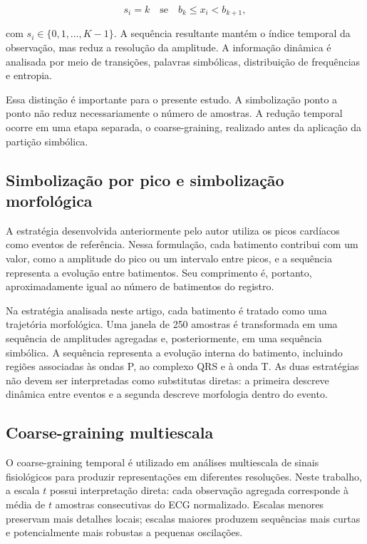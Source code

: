 \documentclass[12pt,a4paper]{article}
\begin{document}
\begin{equation}
    s_i = k \quad \text{se} \quad b_k \leq x_i < b_{k+1},
\end{equation}

com $s_i \in \{0,1,\ldots,K-1\}$. A sequência resultante mantém o índice temporal da observação, mas reduz a resolução da amplitude. A informação dinâmica é analisada por meio de transições, palavras simbólicas, distribuição de frequências e entropia.

Essa distinção é importante para o presente estudo. A simbolização ponto a ponto não reduz necessariamente o número de amostras. A redução temporal ocorre em uma etapa separada, o coarse-graining, realizado antes da aplicação da partição simbólica.

\subsection{Simbolização por pico e simbolização morfológica}

A estratégia desenvolvida anteriormente pelo autor utiliza os picos cardíacos como eventos de referência. Nessa formulação, cada batimento contribui com um valor, como a amplitude do pico ou um intervalo entre picos, e a sequência representa a evolução entre batimentos. Seu comprimento é, portanto, aproximadamente igual ao número de batimentos do registro.

Na estratégia analisada neste artigo, cada batimento é tratado como uma trajetória morfológica. Uma janela de 250 amostras é transformada em uma sequência de amplitudes agregadas e, posteriormente, em uma sequência simbólica. A sequência representa a evolução interna do batimento, incluindo regiões associadas às ondas P, ao complexo QRS e à onda T. As duas estratégias não devem ser interpretadas como substitutas diretas: a primeira descreve dinâmica entre eventos e a segunda descreve morfologia dentro do evento.

\subsection{Coarse-graining multiescala}

O coarse-graining temporal é utilizado em análises multiescala de sinais fisiológicos para produzir representações em diferentes resoluções. Neste trabalho, a escala $t$ possui interpretação direta: cada observação agregada corresponde à média de $t$ amostras consecutivas do ECG normalizado. Escalas menores preservam mais detalhes locais; escalas maiores produzem sequências mais curtas e potencialmente mais robustas a pequenas oscilações.
\end{document}
